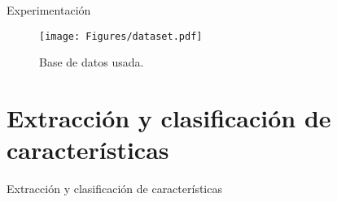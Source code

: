 \documentclass[10pt]{beamer}
\begin{document}
\begin{frame}{Experimentación}

\begin{figure}[ht]
\centering
\texttt{[image: Figures/dataset.pdf]}
\caption{Base de datos usada.}
\label{SOBI}
\end{figure}
\end{frame}





\section{Extracción y clasificación de características}

\begin{frame}{Extracción y clasificación de características}

\begin{table}[h]
\caption{descriptores en el dominio del tiempo}
\centering
{}


\end{table}
\end{frame}
\end{document}
